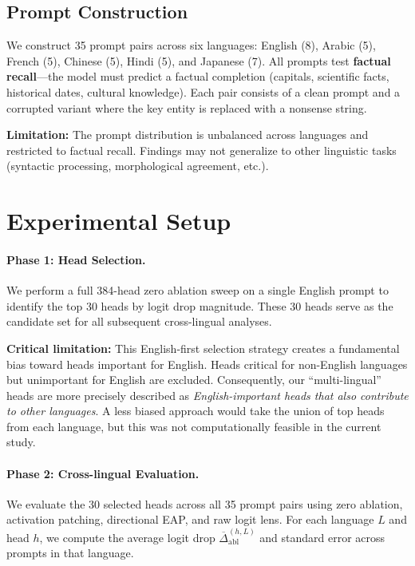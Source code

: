 \documentclass[11pt]{article}
\begin{document}
\subsection{Prompt Construction}

We construct 35 prompt pairs across six languages: English (8), Arabic (5), French (5), Chinese (5), Hindi (5), and Japanese (7).
All prompts test \textbf{factual recall}---the model must predict a factual completion (capitals, scientific facts, historical dates, cultural knowledge).
Each pair consists of a clean prompt and a corrupted variant where the key entity is replaced with a nonsense string.

\textbf{Limitation:} The prompt distribution is unbalanced across languages and restricted to factual recall.
Findings may not generalize to other linguistic tasks (syntactic processing, morphological agreement, etc.).

\section{Experimental Setup}
\label{sec:setup}

\paragraph{Phase 1: Head Selection.}
We perform a full 384-head zero ablation sweep on a single English prompt to identify the top 30 heads by logit drop magnitude.
These 30 heads serve as the candidate set for all subsequent cross-lingual analyses.

\textbf{Critical limitation:} This English-first selection strategy creates a fundamental bias toward heads important for English.
Heads critical for non-English languages but unimportant for English are excluded.
Consequently, our ``multi-lingual'' heads are more precisely described as \emph{English-important heads that also contribute to other languages}.
A less biased approach would take the union of top heads from each language, but this was not computationally feasible in the current study.

\paragraph{Phase 2: Cross-lingual Evaluation.}
We evaluate the 30 selected heads across all 35 prompt pairs using zero ablation, activation patching, directional EAP, and raw logit lens.
For each language $L$ and head $h$, we compute the average logit drop $\overline{\Delta}_{\text{abl}}^{(h,L)}$ and standard error across prompts in that language.
\end{document}
